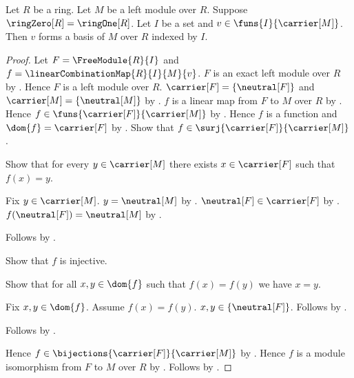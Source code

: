 \begin{theorem}\label{trivial_ring_every_indexed_family_is_basis}
    Let $R$ be a ring.
    Let $M$ be a left module over $R$.
    Suppose $\ringZero[R]=\ringOne[R]$.
    Let $I$ be a set and $v\in\funs{I}{\carrier[M]}$.
    Then $v$ forms a basis of $M$ over $R$ indexed by $I$.
\end{theorem}
\begin{proof}
    Let $F=\FreeModule{R}{I}$ and
        $f=\linearCombinationMap{R}{I}{M}{v}$.
    $F$ is an exact left module over $R$ by
        .
    Hence $F$ is a left module over $R$.
    $\carrier[F]=\{\neutral[F]\}$ and
        $\carrier[M]=\{\neutral[M]\}$ by
        .
    $f$ is a linear map from $F$ to $M$ over $R$ by
        .
    Hence $f\in\funs{\carrier[F]}{\carrier[M]}$ by
        .
    Hence $f$ is a function and $\dom{f}=\carrier[F]$ by
        .
    Show that $f\in\surj{\carrier[F]}{\carrier[M]}$.
    \begin{subproof}
        Show that for every $y\in\carrier[M]$ there exists
            $x\in\carrier[F]$ such that $f(x)=y$.
        \begin{subproof}
            Fix $y\in\carrier[M]$.
            $y=\neutral[M]$ by .
            $\neutral[F]\in\carrier[F]$ by
                .
            $f(\neutral[F])=\neutral[M]$ by .
        \end{subproof}
        Follows by .
    \end{subproof}
    Show that $f$ is injective.
    \begin{subproof}
        Show that for all $x,y\in\dom{f}$ such that $f(x)=f(y)$
            we have $x=y$.
        \begin{subproof}
            Fix $x,y\in\dom{f}$.
            Assume $f(x)=f(y)$.
            $x,y\in\{\neutral[F]\}$.
            Follows by .
        \end{subproof}
        Follows by .
    \end{subproof}
    Hence $f\in\bijections{\carrier[F]}{\carrier[M]}$ by
        .
    Hence $f$ is a module isomorphism from $F$ to $M$ over $R$ by
        .
    Follows by .
\end{proof}

